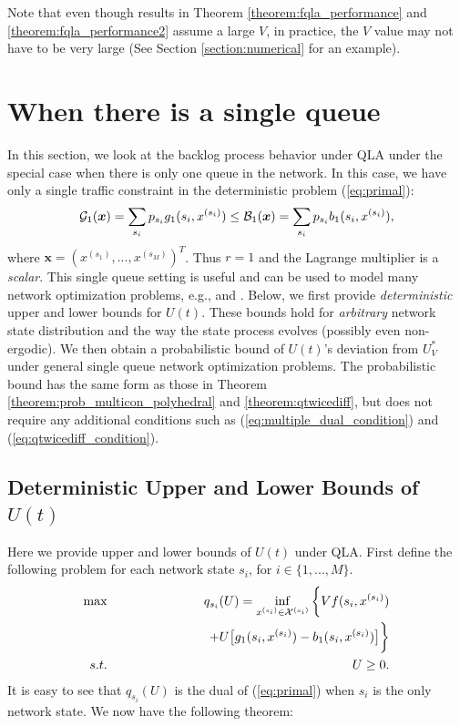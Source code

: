 \documentclass[journal]{IEEEtran}
\newcommand{\bv}[1]{{\boldsymbol{#1} }}
\newcommand{\script}[1]{{{\cal{#1} }}}
\begin{document}
Note that even though results in Theorem \ref{theorem:fqla_performance} and \ref{theorem:fqla_performance2} assume a large $V$, in practice, the $V$ value may not have to be very large (See Section \ref{section:numerical} for an example).
 

\section{When there is a single queue}\label{section:secondspecial}
In this section, we look at the backlog process behavior under QLA under the special case when there is only one queue in the network. In this case, we have only a  single traffic constraint in the deterministic problem (\ref{eq:primal}):
\begin{eqnarray*}
\script{G}_1(\bv{x})=\sum_{s_i}p_{s_i}g_1(s_i, x^{(s_i)}) \leq\script{B}_1(\bv{x})=\sum_{s_i}p_{s_i}b_1(s_i, x^{(s_i)}),
\end{eqnarray*}
where $\bv{x}=(x^{(s_1)},...,x^{(s_M)})^T$. Thus $r=1$ and the Lagrange multiplier is a \emph{scalar}. This single queue setting is useful and can be used to model many network optimization problems, e.g., \cite{neelyenergy} and \cite{huangneelypricing}.  
Below, we first provide \emph{deterministic} upper and lower bounds for  $U(t)$. These bounds hold for \emph{arbitrary} network state distribution  and the way the state process evolves (possibly even non-ergodic). We then obtain a probabilistic bound of $U(t)$'s deviation from $U_V^*$ under general single queue network optimization problems. The probabilistic bound has the same form as those in Theorem \ref{theorem:prob_multicon_polyhedral} and \ref{theorem:qtwicediff}, but does not require any additional conditions such as (\ref{eq:multiple_dual_condition}) and (\ref{eq:qtwicediff_condition}).


\subsection{Deterministic Upper and Lower Bounds of $U(t)$}
Here we provide upper and lower bounds of $U(t)$ under QLA. First define the following problem for each network state $s_i$, for $i\in\{1,...,M\}$. 
\begin{eqnarray}
\max &&q_{s_i}(U)=\inf_{x^{(s_i)}\in\script{X}^{(s_i)}}\bigg\{Vf(s_i, x^{(s_i)})\label{eq:dual_isub}\\
&&\qquad\qquad\qquad\quad+U\big[g_{1}(s_i, x^{(s_i)})-b_1(s_i, x^{(s_i)})\big]\bigg\}\nonumber\\
s.t. && U\geq0.\nonumber
\end{eqnarray}
It is easy to see that $q_{s_i}(U)$ is the dual of (\ref{eq:primal}) when $s_i$ is the only network state. We now have the following theorem:
\end{document}
